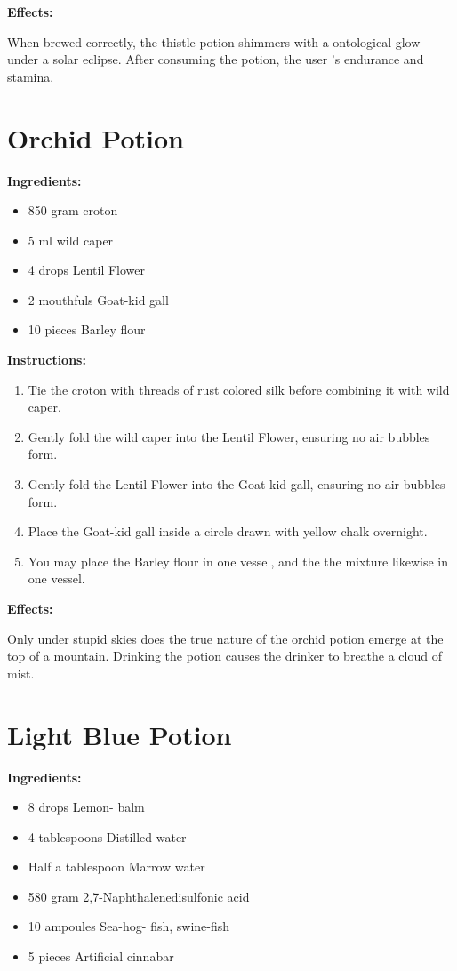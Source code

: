 \documentclass{article}
\begin{document}
\textbf{Effects:}

When brewed correctly, the thistle potion shimmers with a ontological glow under a solar eclipse. After consuming the potion, the user 's endurance and stamina.

\newpage
\section*{Orchid Potion}

\textbf{Ingredients:}

\begin{itemize}
  \item 850 gram croton
  \item 5 ml wild caper
  \item 4 drops Lentil Flower
  \item 2 mouthfuls Goat-kid gall
  \item 10 pieces Barley flour
\end{itemize}

\textbf{Instructions:}

\begin{enumerate}
  \item Tie the croton with threads of rust colored silk before combining it with wild caper.
  \item Gently fold the wild caper into the Lentil Flower, ensuring no air bubbles form.
  \item Gently fold the Lentil Flower into the Goat-kid gall, ensuring no air bubbles form.
  \item Place the Goat-kid gall inside a circle drawn with yellow chalk overnight.
  \item You may place the Barley flour in one vessel, and the the mixture likewise in one vessel.
\end{enumerate}

\textbf{Effects:}

Only under stupid skies does the true nature of the orchid potion emerge at the top of a mountain. Drinking the potion causes the drinker to breathe a cloud of mist.

\newpage
\section*{Light Blue Potion}

\textbf{Ingredients:}

\begin{itemize}
  \item 8 drops Lemon- balm
  \item 4 tablespoons Distilled water
  \item Half a tablespoon Marrow water
  \item 580 gram 2,7-Naphthalenedisulfonic acid
  \item 10 ampoules Sea-hog- fish, swine-fish
  \item 5 pieces Artificial cinnabar
\end{itemize}
\end{document}
